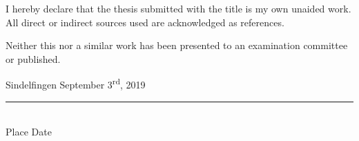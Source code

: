 I hereby declare that the thesis submitted with the title \textit{\@title} is my own unaided work. All direct or indirect sources used are acknowledged as references.

Neither this nor a similar work has been presented to an examination committee or published.

\vspace{4em}

Sindelfingen
\hspace{1.3cm}
September 3\textsuperscript{rd}, 2019
\vspace{-0.4cm}
\\
\rule{15cm}{0.4pt}\\
Place
\hspace{2.5cm}
Date
\hspace{4.5cm}
\@author